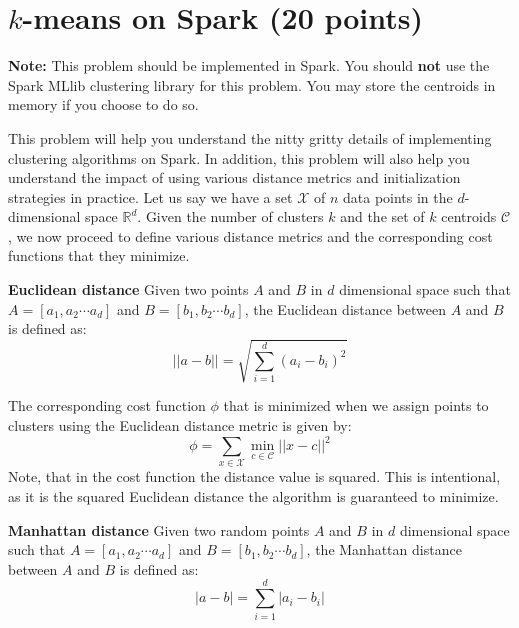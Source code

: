\section{$k$-means on Spark (20 points)}

\textbf{Note:} This problem should be implemented in Spark. You should \textbf{not} use the Spark MLlib clustering library for this problem. You may store the centroids in memory if you choose to do so.

\begin{center}
	{\footnotesize {} \hspace{1em}  \hspace{1em} }
\end{center}


This problem will help you understand the nitty gritty details of implementing
clustering algorithms on Spark. In addition, this problem will also help you
understand the impact of using various distance metrics and initialization
strategies in practice. Let us say we have a set $\mathcal{X}$ of $n$ data
points in the $d$-dimensional space $\mathbb{R}^d$. Given the number of
clusters $k$ and the set of $k$ centroids $\mathcal{C}$, we now proceed to
define various distance metrics and the corresponding cost functions that they
minimize. 

\textbf{Euclidean distance}
Given two points $A$ and $B$ in $d$ dimensional space such that $A = [a_1, a_2 \cdots a_d]$ and $B = [b_1, b_2 \cdots b_d]$, the Euclidean distance between $A$ and $B$ is defined as:
\begin{equation}\label{eqn:ed}
||a - b|| = \sqrt{\sum_{i=1}^{d} (a_i - b_i) ^2}
\end{equation}

The corresponding cost function $\phi$ that is minimized when we assign points to clusters using the Euclidean distance metric is given by:
\begin{equation}\label{eqn:ced}
\phi = \sum_{x\in \mathcal{X}} \min_{c\in\mathcal{C}} ||x-c||^2
\end{equation}
Note, that in the cost function the distance value is squared. This is intentional, as it is the squared Euclidean distance the algorithm is guaranteed to minimize.

\textbf{Manhattan distance}
Given two random points $A$ and $B$ in $d$ dimensional space such that $A = [a_1, a_2 \cdots a_d]$ and $B = [b_1, b_2 \cdots b_d]$, the Manhattan distance between $A$ and $B$ is defined as:
\begin{equation}\label{eqn:md}
|a - b| = \sum_{i=1}^{d} |a_i - b_i|
\end{equation}

